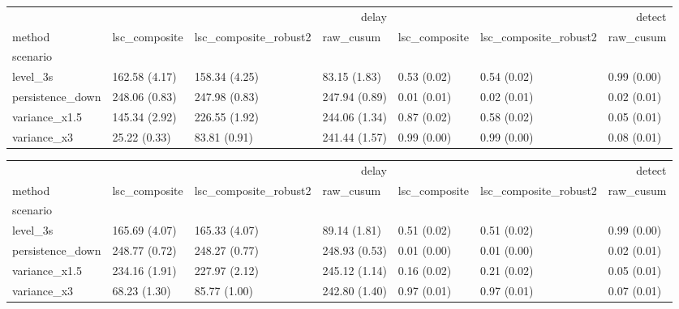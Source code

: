 \begin{tabular}{lllllll}
\toprule
 & \multicolumn{3}{r}{delay} & \multicolumn{3}{r}{detect} \\
method & lsc_composite & lsc_composite_robust2 & raw_cusum & lsc_composite & lsc_composite_robust2 & raw_cusum \\
scenario &  &  &  &  &  &  \\
\midrule
level_3s & 162.58 (4.17) & 158.34 (4.25) & 83.15 (1.83) & 0.53 (0.02) & 0.54 (0.02) & 0.99 (0.00) \\
persistence_down & 248.06 (0.83) & 247.98 (0.83) & 247.94 (0.89) & 0.01 (0.01) & 0.02 (0.01) & 0.02 (0.01) \\
variance_x1.5 & 145.34 (2.92) & 226.55 (1.92) & 244.06 (1.34) & 0.87 (0.02) & 0.58 (0.02) & 0.05 (0.01) \\
variance_x3 & 25.22 (0.33) & 83.81 (0.91) & 241.44 (1.57) & 0.99 (0.00) & 0.99 (0.00) & 0.08 (0.01) \\
\bottomrule
\end{tabular}

\begin{tabular}{lllllll}
\toprule
 & \multicolumn{3}{r}{delay} & \multicolumn{3}{r}{detect} \\
method & lsc_composite & lsc_composite_robust2 & raw_cusum & lsc_composite & lsc_composite_robust2 & raw_cusum \\
scenario &  &  &  &  &  &  \\
\midrule
level_3s & 165.69 (4.07) & 165.33 (4.07) & 89.14 (1.81) & 0.51 (0.02) & 0.51 (0.02) & 0.99 (0.00) \\
persistence_down & 248.77 (0.72) & 248.27 (0.77) & 248.93 (0.53) & 0.01 (0.00) & 0.01 (0.00) & 0.02 (0.01) \\
variance_x1.5 & 234.16 (1.91) & 227.97 (2.12) & 245.12 (1.14) & 0.16 (0.02) & 0.21 (0.02) & 0.05 (0.01) \\
variance_x3 & 68.23 (1.30) & 85.77 (1.00) & 242.80 (1.40) & 0.97 (0.01) & 0.97 (0.01) & 0.07 (0.01) \\
\bottomrule
\end{tabular}
